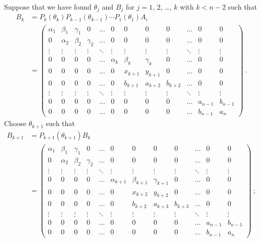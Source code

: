 Suppose that we have found $\theta_j$ and $B_j$ for $j=1$, $2$,
\ldots, $k$ with $k<n-2$ such that
\begin{align*}
B_k &= P_k(\theta_k) P_{k-1}(\theta_{k-1}) \cdots P_1(\theta_1) A_i \\
&= \left(
\begin{array}{cccccccccccc}
\alpha_1 & \beta_1 & \gamma_1 & 0 & \ldots & 0 & 0 & 0 & 0 & \ldots & 0 & 0 \\
0 & \alpha_2 & \beta_2 & \gamma_2 & \ldots & 0 & 0 & 0 & 0 & \ldots & 0 & 0 \\
\vdots & \vdots & \vdots & \vdots & \ddots & \vdots & \vdots & \vdots &
\vdots & \ddots & \vdots & \vdots \\
0 & 0 & 0 & 0 & \ldots & \alpha_k & \beta_k & \gamma_k & 0 & \ldots & 0 & 0\\ 
0 & 0 & 0 & 0 & \ldots & 0 & x_{k+1} & y_{k+1} & 0 & \ldots & 0 & 0 \\
0 & 0 & 0 & 0 & \ldots & 0 & b_{k+1} & a_{k+2} & b_{k+2} & \ldots & 0 & 0 \\
\vdots & \vdots & \vdots & \vdots & \ddots & \vdots & \vdots & \vdots &
\vdots & \ddots & \vdots & \vdots \\
0 & 0 & 0 & 0 & \ldots & 0 & 0 & 0 & 0 & \ldots & a_{n-1} & b_{n-1} \\
0 & 0 & 0 & 0 & \ldots & 0 & 0 & 0 & 0 & \ldots & b_{n-1} & a_n
\end{array}\right) \ .
\end{align*}
Choose $\theta_{k+1}$ such that
\begin{align*}
B_{k+1} &= P_{k+1}(\theta_{k+1}) B_k \\
&= \left(
\begin{array}{cccccccccccc}
\alpha_1 & \beta_1 & \gamma_1 & 0 & \ldots & 0 & 0 & 0 & 0 & \ldots & 0 & 0 \\
0 & \alpha_2 & \beta_2 & \gamma_2 & \ldots & 0 & 0 & 0 & 0 & \ldots & 0 & 0 \\
\vdots & \vdots & \vdots & \vdots & \ddots & \vdots & \vdots & \vdots &
\vdots & \ddots & \vdots & \vdots \\
0 & 0 & 0 & 0 & \ldots & \alpha_{k+1} & \beta_{k+1} & \gamma_{k+1} & 0 &
\ldots & 0 & 0 \\
0 & 0 & 0 & 0 & \ldots & 0 & x_{k+2} & y_{k+2} & 0 & \ldots & 0 & 0 \\
0 & 0 & 0 & 0 & \ldots & 0 & b_{k+2} & a_{k+3} & b_{k+3} & \ldots & 0 & 0 \\
\vdots & \vdots & \vdots & \vdots & \ddots & \vdots & \vdots & \vdots &
\vdots & \ddots & \vdots & \vdots \\
0 & 0 & 0 & 0 & \ldots & 0 & 0 & 0 & 0 & \ldots & a_{n-1} & b_{n-1} \\
0 & 0 & 0 & 0 & \ldots & 0 & 0 & 0 & 0 & \ldots & b_{n-1} & a_n
\end{array}\right) \ ;
\end{align*}

